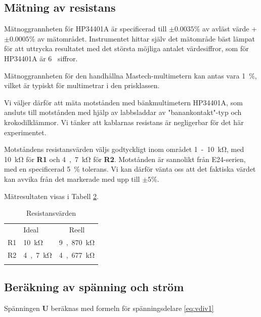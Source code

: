 \documentclass[11pt,a4paper]{article}
\begin{document}
\subsection{Mätning av resistans}\label{vdiv2}
\par Mätnoggrannheten för HP34401A är specificerad till $\pm{}0.0035\%$ av
avläst värde + $\pm{}0.0005\%$ av mätområdet. Instrumentet hittar själv det
mätområde bäst lämpat för att uttrycka resultatet med det största möjliga antalet
värdesiffror, som för HP34401A är \si{6} siffror.
\par Mätnoggrannheten för den handhållna Mastech-multimetern kan antas vara
\si{1\%}, vilket är typiskt för multimetrar i den prisklassen.
\par Vi väljer därför att mäta motstånden med bänkmultimetern HP34401A, som ansluts
till motstånden med hjälp av labbsladdar av "banankontakt"-typ och krokodilklämmor.
Vi tänker att kablarnas resistans är negligerbar för det här experimentet.
\\
\par Motståndens resistansvärden väljs godtyckligt inom området \si{1-10\kohm}, 
med \si{10\kohm} för \textbf{R1} och \si{4,7\kohm} för \textbf{R2}.
Motstånden är sannolikt från E24-serien, med en specificerad \si{5\%} tolerans. Vi kan
därför vänta oss att det faktiska värdet kan avvika från det markerade med upp till
$\pm{}5\%$. 
\par Mätresultaten visas i Tabell \ref{restable}.

\begin{table}
    \begin{longtable}[c]{@{}llc@{}}
        \toprule\addlinespace
           & Ideal         & Reell
        \\\addlinespace
        \midrule\endhead
        R1 & \si{10\kohm}  & \si{9,870\kohm}
        \\\addlinespace
        R2 & \si{4,7\kohm} & \si{4,677\kohm}
        \\\addlinespace
        \bottomrule
        \addlinespace
        \caption{Resistansvärden}
        \label{restable}
    \end{longtable}
\end{table}



\subsection{Beräkning av spänning och ström}\label{vdiv_multi}
Spänningen \textbf{U} beräknas med formeln för spänningsdelare \eqref{eq:vdiv1}
\end{document}
